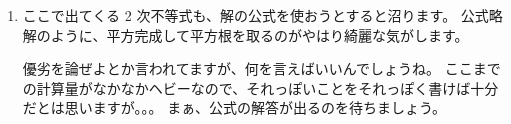 \documentclass[./main.tex]{subfiles}
\begin{document}
\begin{enumerate}
        \item ここで出てくる 2 次不等式も、解の公式を使おうとすると沼ります。
        公式略解のように、平方完成して平方根を取るのがやはり綺麗な気がします。

        優劣を論ぜよとか言われてますが、何を言えばいいんでしょうね。
        ここまでの計算量がなかなかヘビーなので、それっぽいことをそれっぽく書けば十分だとは思いますが。。。
        まぁ、公式の解答が出るのを待ちましょう。
        
    \end{enumerate}
\end{document}
